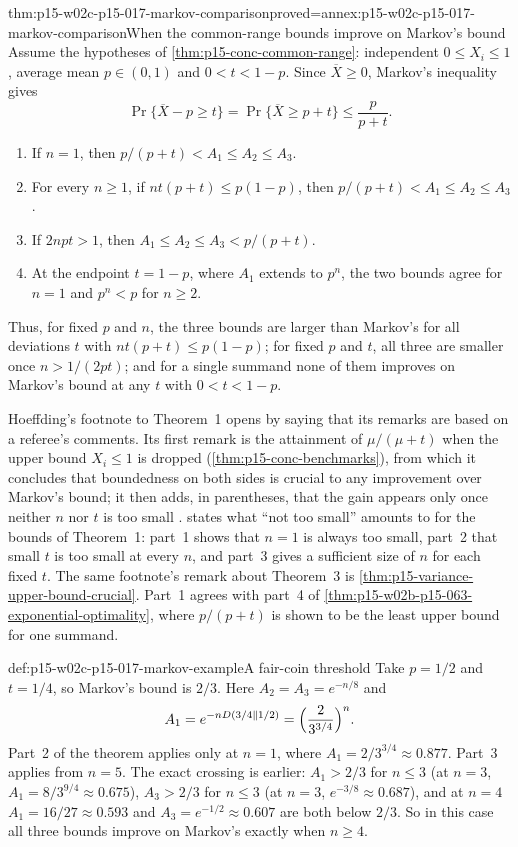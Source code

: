 \begin{hbtheorem}{thm:p15-w02c-p15-017-markov-comparison}{proved=annex:p15-w02c-p15-017-markov-comparison}{When the common-range bounds improve on Markov's bound}
Assume the hypotheses of \cref{thm:p15-conc-common-range}: independent
\(0\leq X_i\leq1\), average mean \(p\in(0,1)\) and \(0<t<1-p\). Since
\(\overline X\geq0\), Markov's inequality gives
\[
 \Pr\{\overline X-p\geq t\}=\Pr\{\overline X\geq p+t\}\leq\frac p{p+t}.
\]
\begin{enumerate}
\item If \(n=1\), then \(p/(p+t)<A_1\leq A_2\leq A_3\).
\item For every \(n\geq1\), if \(nt(p+t)\leq p(1-p)\), then
\(p/(p+t)<A_1\leq A_2\leq A_3\).
\item If \(2npt>1\), then \(A_1\leq A_2\leq A_3<p/(p+t)\).
\item At the endpoint \(t=1-p\), where \(A_1\) extends to \(p^n\), the two
bounds agree for \(n=1\) and \(p^n<p\) for \(n\geq2\).
\end{enumerate}
Thus, for fixed \(p\) and \(n\), the three bounds are larger than Markov's
for all deviations \(t\) with \(nt(p+t)\leq p(1-p)\); for fixed \(p\) and
\(t\), all three are smaller once \(n>1/(2pt)\); and for a single
summand none of them improves on Markov's bound at any \(t\) with
\(0<t<1-p\).
\end{hbtheorem}

Hoeffding's footnote to Theorem~1 opens by saying that its remarks are
based on a referee's comments. Its first remark is the attainment of
\(\mu/(\mu+t)\) when the upper bound \(X_i\leq1\) is dropped
(\cref{thm:p15-conc-benchmarks}), from which it concludes that
boundedness on both sides is crucial to any improvement over Markov's
bound; it then adds, in parentheses, that the gain appears only once
neither \(n\) nor \(t\) is too small \cite[p.~15 n.~4]{Hoeffding1963BoundedSums}.
 states what ``not too
small'' amounts to for the bounds of Theorem~1: part~1 shows that \(n=1\)
is always too small, part~2 that small \(t\) is too small at every \(n\),
and part~3 gives a sufficient size of \(n\) for each fixed \(t\). The
same footnote's remark about Theorem~3 is
\cref{thm:p15-variance-upper-bound-crucial}. Part~1 agrees with part~4 of
\cref{thm:p15-w02b-p15-063-exponential-optimality}, where \(p/(p+t)\) is
shown to be the least upper bound for one summand.

\begin{hbexample}{def:p15-w02c-p15-017-markov-example}{A fair-coin threshold}
Take \(p=1/2\) and \(t=1/4\), so Markov's bound is \(2/3\). Here
\(A_2=A_3=e^{-n/8}\) and
\[
 A_1=e^{-nD(3/4\Vert1/2)}=\Bigl(\frac2{3^{3/4}}\Bigr)^n .
\]
Part~2 of the theorem applies only at \(n=1\), where
\(A_1=2/3^{3/4}\approx0.877\). Part~3 applies from \(n=5\). The exact
crossing is earlier: \(A_1>2/3\) for \(n\leq3\) (at \(n=3\),
\(A_1=8/3^{9/4}\approx0.675\)), \(A_3>2/3\) for \(n\leq3\)
(at \(n=3\), \(e^{-3/8}\approx0.687\)), and at \(n=4\)
\(A_1=16/27\approx0.593\) and \(A_3=e^{-1/2}\approx0.607\) are both below
\(2/3\). So in this case all three bounds improve on Markov's exactly
when \(n\geq4\).
\end{hbexample}

